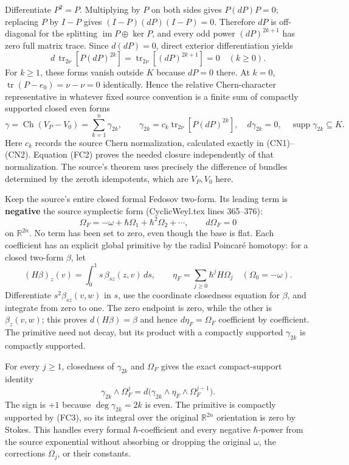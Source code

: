 \documentclass[
  11pt,
]{article}
\begin{document}
Differentiate \(P^2=P\). Multiplying by \(P\) on both sides gives
\(P(dP)P=0\); replacing \(P\) by \(I-P\) gives \((I-P)(dP)(I-P)=0\).
Therefore \(dP\) is off-diagonal for the splitting
\(\operatorname{im}P\oplus\ker P\), and every odd power \((dP)^{2k+1}\)
has zero full matrix trace. Since \(d(dP)=0\), direct exterior
differentiation yields \[
 d\,\operatorname{tr}_{2\nu}[P(dP)^{2k}]
   =\operatorname{tr}_{2\nu}[(dP)^{2k+1}]=0
   \quad(k\ge0).
 \tag{FC2}
\] For \(k\ge1\), these forms vanish outside \(K\) because \(dP=0\)
there. At \(k=0\), \(\operatorname{tr}(P-e_0)=\nu-\nu=0\) identically.
Hence the relative Chern-character representative in whatever fixed
source convention is a finite sum of compactly supported closed even
forms \[
 \gamma=\operatorname{Ch}(V_P-V_0)
   =\sum_{k=1}^{n}\gamma_{2k},\qquad
 \gamma_{2k}=c_k\operatorname{tr}_{2\nu}[P(dP)^{2k}],
 \quad d\gamma_{2k}=0,\quad
 \operatorname{supp}\gamma_{2k}\subseteq K .
 \tag{FC3}
\] Here \(c_k\) records the source Chern normalization, calculated
exactly in (CN1)--(CN2). Equation (FC2) proves the needed closure
independently of that normalization. The source's theorem uses precisely
the difference of bundles determined by the zeroth idempotents, which
are \(V_P,V_0\) here.

Keep the source's entire closed formal Fedosov two-form. Its leading
term is \textbf{negative} the source symplectic form (CyclicWeyl.tex
lines 365--376): \[
 \Omega_F=-\omega+\hbar\Omega_1+\hbar^2\Omega_2+\cdots,
 \qquad d\Omega_F=0
 \tag{FC4}
\] on \(\mathbb R^{2n}\). No term has been set to zero, even though the
base is flat. Each coefficient has an explicit global primitive by the
radial Poincaré homotopy: for a closed two-form \(\beta\), let \[
 (H\beta)_z(v)
   =\int_0^1 s\,\beta_{sz}(z,v)\,ds,\qquad
 \eta_F=\sum_{j\ge0}\hbar^j H\Omega_j
 \quad(\Omega_0=-\omega).
 \tag{FC5}
\] Differentiate \(s^2\beta_{sz}(v,w)\) in \(s\), use the coordinate
closedness equation for \(\beta\), and integrate from zero to one. The
zero endpoint is zero, while the other is \(\beta_z(v,w)\); this proves
\(d(H\beta)=\beta\) and hence \(d\eta_F=\Omega_F\) coefficient by
coefficient. The primitive need not decay, but its product with a
compactly supported \(\gamma_{2k}\) is compactly supported.

For every \(j\ge1\), closedness of \(\gamma_{2k}\) and \(\Omega_F\)
gives the exact compact-support identity \[
 \gamma_{2k}\wedge\Omega_F^j
 =d\bigl(\gamma_{2k}\wedge\eta_F
              \wedge\Omega_F^{j-1}\bigr).
 \tag{FC6}
\] The sign is \(+1\) because \(\deg\gamma_{2k}=2k\) is even. The
primitive is compactly supported by (FC3), so its integral over the
original \(\mathbb R^{2n}\) orientation is zero by Stokes. This handles
every formal \(\hbar\)-coefficient and every negative \(\hbar\)-power
from the source exponential without absorbing or dropping the original
\(\omega\), the corrections \(\Omega_j\), or their constants.
\end{document}
